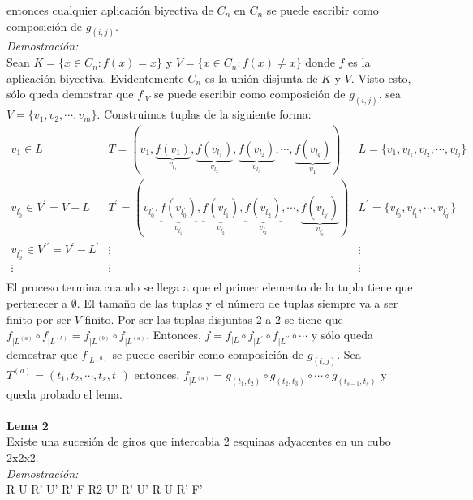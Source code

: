\documentclass{article}
\begin{document}
entonces cualquier aplicación biyectiva de $C_n$ en $C_n$ se puede escribir como composición de $g_{(i,j)}$.\\
\textit{Demostración:}\\
Sean $K=\{ x\in C_n : f(x)=x \}$ y $V=\{ x\in C_n : f(x)\ne x \}$ donde $f$ es la aplicación biyectiva. Evidentemente $C_n$ es la unión disjunta de $K$ y $V$. Visto esto, sólo queda demostrar que $f_{|V}$ se puede escribir como composición de $g_{(i,j)}$. sea $V=\{ v_1, v_2, \cdots, v_m \}$. Construimos tuplas de la siguiente forma:
$$
\begin{array}{ccc}
    v_1 \in L & T = (v_1, \underbrace{f(v_1)}_{v_{l_1}}, \underbrace{f(v_{l_1})}_{v_{l_2}}, \underbrace{f(v_{l_2})}_{v_{l_3}}, \cdots , \underbrace{f(v_{l_q})}_{v_1}) & L=\{v_1,v_{l_1},v_{l_2}, \cdots, v_{l_q} \} \\
    v_{l^\prime_0} \in V^\prime = V-L & T^\prime = (v_{l^\prime_0}, \underbrace{f(v_{l^\prime_0})}_{v_{l^\prime_1}}, \underbrace{f(v_{l^\prime_1})}_{v_{l^\prime_2}}, \underbrace{f(v_{l^\prime_2})}_{v_{l^\prime_3}}, \cdots , \underbrace{f(v_{l^\prime_{q^\prime}})}_{v_{l^\prime_0}}) & L^\prime=\{ v_{l^\prime_0}, v_{l^\prime_1} , \cdots , v_{l^\prime_{q^\prime}} \} \\
    v_{l^{\prime \prime}_0} \in V^{\prime \prime} = V^\prime - L^\prime & \vdots & \vdots \\
    \vdots & \vdots & \vdots \\
\end{array}
$$
El proceso termina cuando se llega a que el primer elemento de la tupla tiene que pertenecer a $\emptyset$. El tamaño de las tuplas y el número de tuplas siempre va a ser finito por ser $V$ finito. Por ser las tuplas disjuntas 2 a 2 se tiene que $f_{|L^{(a)}} \circ f_{|L^{(b)}} = f_{|L^{(b)}} \circ f_{|L^{(a)}}$. Entonces, $f=f_{|L} \circ f_{|L^\prime} \circ f_{|L^{\prime \prime}} \circ \cdots$ y sólo queda demostrar que $f_{|L^{(a)}}$ se puede escribir como composición de $g_{(i,j)}$. Sea $T^{(a)}=(t_1, t_2, \cdots, t_s, t_1)$ entonces, $f_{|L^{(a)}} = g_{(t_1,t_2)} \circ g_{(t_2, t_3)} \circ \cdots \circ g_{(t_{s-1}, t_s)}$ y queda probado el lema.\\\\
\textbf{Lema 2}\\
Existe una sucesión de giros que intercabia 2 esquinas adyacentes en un cubo 2x2x2.\\
\textit{Demostración:}\\
R U R' U' R' F R2 U' R' U' R U R' F' \dag\\\\
\end{document}
